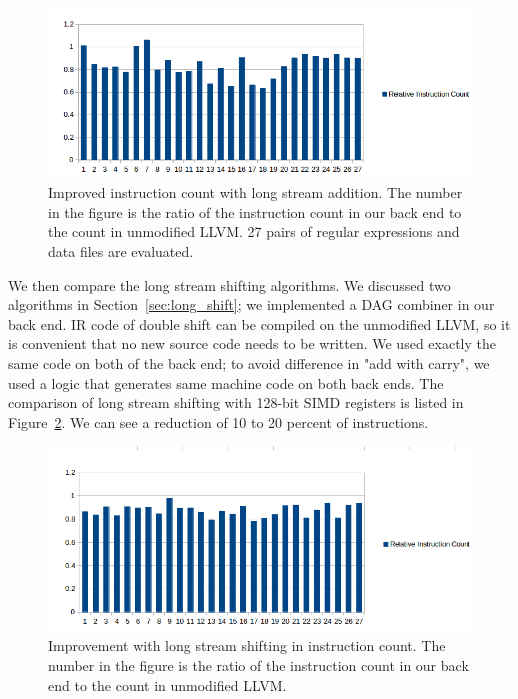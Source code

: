\begin{figure}[htbp!]
\centering
\includegraphics[width=140mm]{draw/inst_count_long_add.png}
\caption[Improvement with long stream addition and the new intrinsic in instruction count]{Improved instruction count with long stream addition. The number in the figure is the ratio of the instruction count in our back end to the count in unmodified LLVM. 27 pairs of regular expressions and data files are evaluated.}
\label{fig:inst_count_long_add}
\end{figure}

We then compare the long stream shifting algorithms. We discussed two algorithms in Section~\ref{sec:long_shift}; we implemented a DAG combiner in our back end. IR code of double shift can be compiled on the unmodified LLVM, so it is convenient that no new source code needs to be written. We used exactly the same code on both of the back end; to avoid difference in "add with carry", we used a logic that generates same machine code on both back ends. The comparison of long stream shifting with 128-bit SIMD registers is listed in Figure~\ref{fig:inst_count_long_shift}. We can see a reduction of 10 to 20 percent of instructions.

\begin{figure}[htbp!]
\centering
\includegraphics[width=140mm]{draw/inst_count_long_shift.png}
\caption[Improvement with long stream shifting in instruction count]{Improvement with long stream shifting in instruction count. The number in the figure is the ratio of the instruction count in our back end to the count in unmodified LLVM.}
\label{fig:inst_count_long_shift}
\end{figure}

